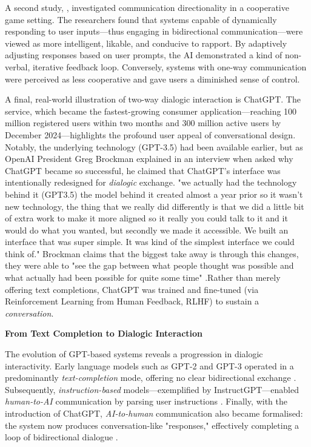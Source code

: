 A second study, \cite{Ashktorab2021-ie}, investigated communication directionality in a cooperative game setting. The researchers found that systems capable of dynamically responding to user inputs—thus engaging in bidirectional communication—were viewed as more intelligent, likable, and conducive to rapport. By adaptively adjusting responses based on user prompts, the AI demonstrated a kind of non-verbal, iterative feedback loop. Conversely, systems with one-way communication were perceived as less cooperative and gave users a diminished sense of control.

A final, real-world illustration of two-way dialogic interaction is ChatGPT. The service, which became the fastest-growing consumer application—reaching 100 million registered users within two months and 300 million active users by December 2024—highlights the profound user appeal of conversational design. Notably, the underlying technology (GPT-3.5) had been available earlier, but as OpenAI President Greg Brockman explained in an interview when asked why ChatGPT became so successful, he claimed that ChatGPT's interface was intentionally redesigned for \textit{dialogic} exchange. "we actually had the technology behind it (GPT3.5) the model behind it created almost a year prior so it wasn't new technology, the thing that we really did differently is that we did a little bit of extra work to make it more aligned so it really you could talk to it and it would do what you wanted, but secondly we made it accessible. We built an interface that was super simple. It was kind of the simplest interface we could think of." Brockman claims that the biggest take away is through this changes, they were able to "see the gap between what people thought was possible and what actually had been possible for quite some time" \cite{SXSW2023-wg}.Rather than merely offering text completions, ChatGPT was trained and fine-tuned (via Reinforcement Learning from Human Feedback, RLHF) to sustain a \textit{conversation}. 

\textbf{From Text Completion to Dialogic Interaction}

The evolution of GPT-based systems reveals a progression in dialogic interactivity. Early language models such as GPT-2 and GPT-3 operated in a predominantly \textit{text-completion} mode, offering no clear bidirectional exchange \cite{Brown2020-js}. Subsequently, \textit{instruction-based} models—exemplified by InstructGPT—enabled \textit{human-to-AI} communication by parsing user instructions \cite{OpenAI2022-pj}. Finally, with the introduction of ChatGPT, \textit{AI-to-human} communication also became formalised: the system now produces conversation-like "responses," effectively completing a loop of bidirectional dialogue \cite{OpenAI2022-wx}.


